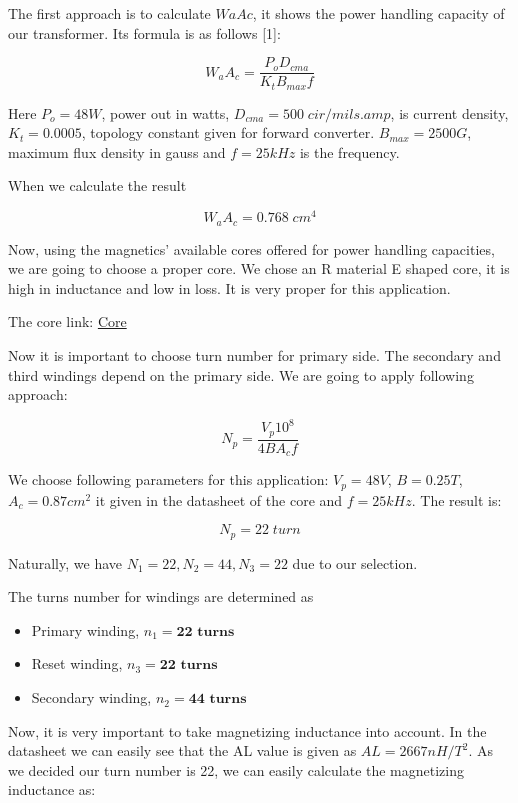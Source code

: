 The first approach is to calculate $WaAc$, it shows the power handling capacity of our transformer. Its formula is as follows [1]:

\begin{equation}
    W_a A_c = \dfrac{P_o D_{cma}}{K_t B_{max} f}
\end{equation}

Here $P_o = 48W$, power out in watts, $D_{cma} = 500 \; cir/mils.amp$, is current density, $K_t = 0.0005$, topology constant given for forward converter. $B_{max} = 2500 G$, maximum flux density in gauss and $f=25kHz$ is the frequency. 

When we calculate the result

$$ W_a A_c = 0.768 \; cm^4$$

Now, using the magnetics' available cores offered for power handling capacities, we are going to choose a proper core. We chose an R material E shaped core, it is high in inductance and low in loss. It is very proper for this application.

The core link: \href{https://www.mag-inc.com/Media/Magnetics/Datasheets/0R43515EC.pdf}{Core}

Now it is important to choose turn number for primary side. The secondary and third windings depend on the primary side. We are going to apply following approach:

\begin{equation}
    N_p = \dfrac{V_p 10^8}{4BA_c f}
\end{equation}

We choose following parameters for this application: $V_p = 48V$, $B = 0.25 T $, $A_c = 0.87 cm^2$ it given in the datasheet of the core and $f=25kHz$. The result is:

$$N_p = 22 \; turn$$

Naturally, we have $N_1 = 22, N_2 = 44, N_3 = 22$ due to our selection.


The turns number for windings are determined as 
\begin{itemize}
    \item Primary winding, $n_1 = \textbf{22 turns}$
    \item Reset winding, $n_3 = \textbf{22 turns}$
    \item Secondary winding, $n_2 = \textbf{44 turns}$
\end{itemize}

Now, it is very important to take magnetizing inductance into account. In the datasheet we can easily see that the AL value is given as $AL = 2667 nH/T^2$. As we decided our turn number is 22, we can easily calculate the magnetizing inductance as:

